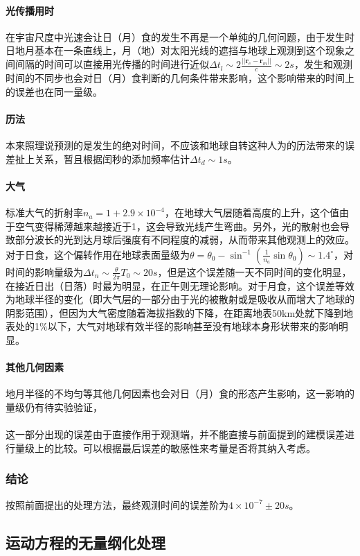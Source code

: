\documentclass[hidelinks]{article}
\begin{document}
\paragraph{光传播用时}
在宇宙尺度中光速会让日（月）食的发生不再是一个单纯的几何问题，由于发生时日地月基本在一条直线上，月（地）对太阳光线的遮挡与地球上观测到这个现象之间间隔的时间可以直接用光传播的时间进行近似$\Delta t_l\sim2\frac{||\mathbf{r}_e-\mathbf{r}_m||}{c}\sim2s$，发生和观测时间的不同步也会对日（月）食判断的几何条件带来影响，这个影响带来的时间上的误差也在同一量级。
\paragraph{历法}
本来照理说预测的是发生的绝对时间，不应该和地球自转这种人为的历法带来的误差扯上关系，暂且根据闰秒的添加频率估计$\Delta t_d\sim 1s$。
\paragraph{大气}
标准大气的折射率$n_a=1+2.9\times10^{-4}$，在地球大气层随着高度的上升，这个值由于空气变得稀薄越来越接近于1，这会导致光线产生弯曲。另外，光的散射也会导致部分波长的光到达月球后强度有不同程度的减弱，从而带来其他观测上的效应。对于日食，这个偏转作用在地球表面量级为$\theta=\theta_0-\sin^{-1}(\frac{1}{n_a}\sin\theta_0)\sim1.4^\circ$，对时间的影响量级为$\Delta t_n\sim\frac{\theta}{2\pi}T_0\sim20s$，但是这个误差随一天不同时间的变化明显，在接近日出（日落）时最为明显，在正午则无理论影响。对于月食，这个误差等效为地球半径的变化（即大气层的一部分由于光的被散射或是吸收从而增大了地球的阴影范围），但因为大气密度随着海拔指数的下降，在距离地表50km处就下降到地表处的1\%以下，大气对地球有效半径的影响甚至没有地球本身形状带来的影响明显。
\paragraph{其他几何因素}
地月半径的不均匀等其他几何因素也会对日（月）食的形态产生影响，这一影响的量级仍有待实验验证，
\\
\\
这一部分出现的误差由于直接作用于观测端，并不能直接与前面提到的建模误差进行量级上的比较。可以根据最后误差的敏感性来考量是否将其纳入考虑。
\subsubsection{结论}
按照前面提出的处理方法，最终观测时间的误差阶为$4\times10^{-7}\pm20s$。
\subsection{运动方程的无量纲化处理}
\end{document}
